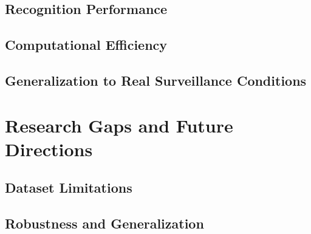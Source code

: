 \documentclass[11pt,a4paper]{article}
\begin{document}
    \subsection{Recognition Performance}
    \label{subsec:recognition-performance}

    \subsection{Computational Efficiency}
    \label{subsec:computational-efficiency}

    \subsection{Generalization to Real Surveillance Conditions}
    \label{subsec:real-world-generalization}

    \section{Research Gaps and Future Directions}
    \label{sec:research-gaps}

    \subsection{Dataset Limitations}
    \label{subsec:dataset-limitations}

    \subsection{Robustness and Generalization}
    \label{subsec:robustness-generalization}
\end{document}
